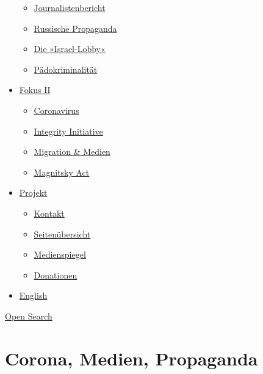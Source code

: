 \begin{itemize}
  \begin{itemize}
  \tightlist
  \item
    \href{https://swprs.org/bericht-eines-journalisten/}{Journalistenbericht}
  \item
    \href{https://swprs.org/russische-propaganda/}{Russische Propaganda}
  \item
    \href{https://swprs.org/die-israel-lobby-fakten-und-mythen/}{Die
    »Israel-Lobby«}
  \item
    \href{https://swprs.org/geopolitik-und-paedokriminalitaet/}{Pädokriminalität}
  \end{itemize}
\item
  \href{https://swprs.org/migration-und-medien/}{Fokus II}

  \begin{itemize}
  \tightlist
  \item
    \href{https://swprs.org/covid-19-hinweis-ii/}{Coronavirus}
  \item
    \href{https://swprs.org/die-integrity-initiative/}{Integrity
    Initiative}
  \item
    \href{https://swprs.org/migration-und-medien/}{Migration \& Medien}
  \item
    \href{https://swprs.org/der-fall-magnitsky/}{Magnitsky Act}
  \end{itemize}
\item
  \href{https://swprs.org/kontakt/}{Projekt}

  \begin{itemize}
  \tightlist
  \item
    \href{https://swprs.org/kontakt/}{Kontakt}
  \item
    \href{https://swprs.org/uebersicht/}{Seitenübersicht}
  \item
    \href{https://swprs.org/medienspiegel/}{Medienspiegel}
  \item
    \href{https://swprs.org/donationen/}{Donationen}
  \end{itemize}
\item
  \href{https://swprs.org/contact/}{English}
\end{itemize}

\protect\hyperlink{}{Open Search}

\hypertarget{corona-medien-propaganda}{%
\section{Corona, Medien, Propaganda}\label{corona-medien-propaganda}}

